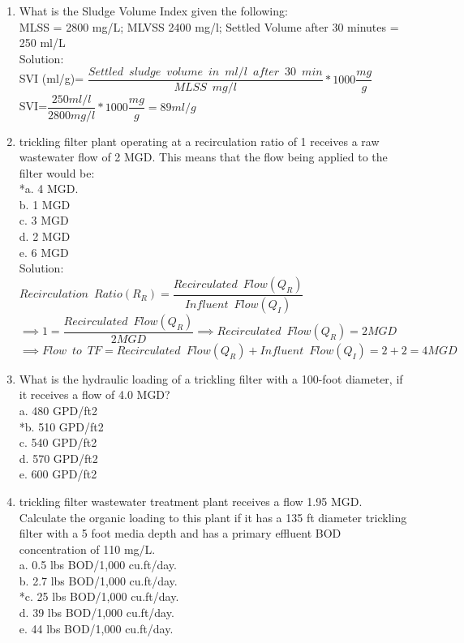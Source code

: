 \documentclass{article}
\begin{document}
\begin{enumerate}
\item What is the Sludge Volume Index given the following:\\  MLSS = 2800 mg/L; MLVSS 2400 mg/l; Settled Volume after 30 minutes = 250 ml/L\\
\vspace{0.3cm} 
Solution:\\
SVI (ml/g)= $\dfrac{Settled \enspace sludge \enspace volume \enspace in \enspace ml/l \enspace after \enspace 30 \enspace min}{MLSS \enspace mg/l}*1000 \dfrac{mg}{g}$\\
\vspace{0.5cm}
SVI=$\dfrac{250ml/l}{2800mg/l}*1000\dfrac{mg}{g}=\boxed{89ml/g}$\\
\item trickling filter plant operating at a recirculation ratio of 1 receives a raw wastewater flow of 2 MGD. This means that the flow being applied to the filter would be:\\
*a. 4 MGD.\\
b. 1 MGD\\
c. 3 MGD\\
d. 2 MGD\\
e. 6 MGD\\
Solution:\\
\vspace{0.5cm}
$Recirculation \enspace Ratio (R_R)=\dfrac{Recirculated \enspace Flow (Q_R)}{Influent  \enspace  Flow (Q_I)}$\\
\vspace{0.5cm}
$ \implies 1=\dfrac{Recirculated \enspace Flow (Q_R)}{2MGD} \implies Recirculated \enspace Flow (Q_R)=2MGD$\\
$\implies Flow \enspace to \enspace TF= Recirculated \enspace Flow (Q_R)+Influent  \enspace  Flow (Q_I)=2+2=\boxed{4MGD}$


\item What is the hydraulic loading of a trickling filter with a 100-foot diameter, if it receives a flow of 4.0 MGD?\\
a. 480 GPD/ft2\\
*b. 510 GPD/ft2\\
c. 540 GPD/ft2\\
d. 570 GPD/ft2\\
e. 600 GPD/ft2

\item trickling filter wastewater treatment plant receives a flow 1.95 MGD. Calculate the organic loading to this plant if it has a 135 ft diameter trickling filter with a 5 foot media depth and has a primary effluent BOD concentration of 110 mg/L.\\
a. 0.5 lbs BOD/1,000 cu.ft/day.\\
b. 2.7 lbs BOD/1,000 cu.ft/day.\\
*c. 25 lbs BOD/1,000 cu.ft/day.\\
d. 39 lbs BOD/1,000 cu.ft/day.\\
e. 44 lbs BOD/1,000 cu.ft/day.\\


\end{enumerate}
\end{document}
